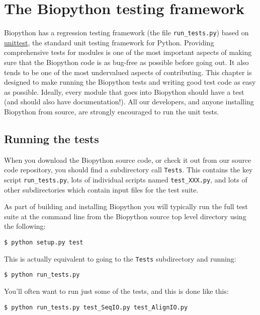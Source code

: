 \chapter{The Biopython testing framework}
\label{chapter:testing}

Biopython has a regression testing framework (the file
\verb|run_tests.py|) based on
\href{https://docs.python.org/3/library/unittest.html}{unittest},
the standard unit testing framework for Python.  Providing comprehensive
tests for modules is one of the most important aspects of making sure that
the Biopython code is as bug-free as possible before going out.
It also tends to be one of the most undervalued aspects of contributing.
This chapter is designed to make running the Biopython tests and
writing good test code as easy as possible.
Ideally, every module that goes into Biopython
should have a test (and should also have documentation!).
All our developers, and anyone installing Biopython from source,
are strongly encouraged to run the unit tests.

\section{Running the tests}

When you download the Biopython source code, or check it out from
our source code repository, you should find a subdirectory call
\verb|Tests|.  This contains the key script \verb|run_tests.py|,
lots of individual scripts named \verb|test_XXX.py|, and lots of
other subdirectories which contain input files for the test suite.

As part of building and installing Biopython you will typically
run the full test suite at the command line from the Biopython
source top level directory using the following:

\begin{verbatim}
$ python setup.py test
\end{verbatim}

This is actually equivalent to going to the \verb|Tests|
subdirectory and running:

\begin{verbatim}
$ python run_tests.py
\end{verbatim}

You'll often want to run just some of the tests, and this is done
like this:

\begin{verbatim}
$ python run_tests.py test_SeqIO.py test_AlignIO.py
\end{verbatim}

